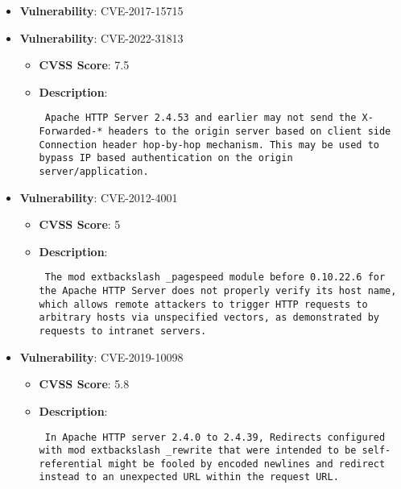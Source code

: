 \documentclass{article}
\begin{document}
\begin{itemize}
        \item \textbf{Vulnerability}: CVE-2017-15715
    
        \item \textbf{Vulnerability}: CVE-2022-31813
        \begin{itemize}
            \item \textbf{CVSS Score}:  7.5 
            \item \textbf{Description}: \parbox{\linewidth}{\texttt{ Apache HTTP Server 2.4.53 and earlier may not send the X-Forwarded-* headers to the origin server based on client side Connection header hop-by-hop mechanism. This may be used to bypass IP based authentication on the origin server/application. }}
        \end{itemize}
    
        \item \textbf{Vulnerability}: CVE-2012-4001
        \begin{itemize}
            \item \textbf{CVSS Score}:  5 
            \item \textbf{Description}: \parbox{\linewidth}{\texttt{ The mod	extbackslash _pagespeed module before 0.10.22.6 for the Apache HTTP Server does not properly verify its host name, which allows remote attackers to trigger HTTP requests to arbitrary hosts via unspecified vectors, as demonstrated by requests to intranet servers. }}
        \end{itemize}
    
        \item \textbf{Vulnerability}: CVE-2019-10098
        \begin{itemize}
            \item \textbf{CVSS Score}:  5.8 
            \item \textbf{Description}: \parbox{\linewidth}{\texttt{ In Apache HTTP server 2.4.0 to 2.4.39, Redirects configured with mod	extbackslash _rewrite that were intended to be self-referential might be fooled by encoded newlines and redirect instead to an unexpected URL within the request URL. }}
        \end{itemize}
    

\end{itemize}
\end{document}
